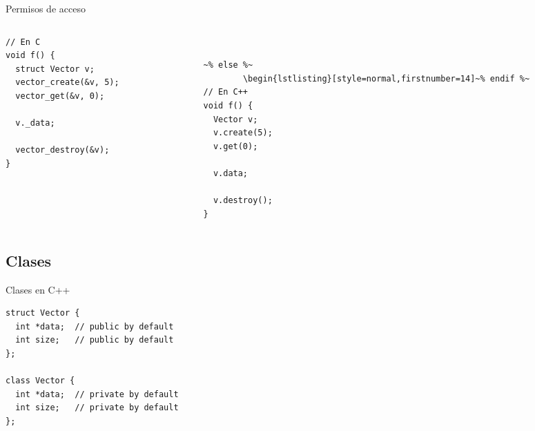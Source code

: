 \begin{frame}[fragile]{Permisos de acceso}{}
   \begin{columns}[t]
      \begin{column}{.4\linewidth}
         \begin{lstlisting}[style=normal,firstnumber=14]
// En C
void f() {
  struct Vector v;
  vector_create(&v, 5);
  vector_get(&v, 0);

  v._data;

  vector_destroy(&v);
}
         \end{lstlisting}
     \end{column}
      \begin{column}{.4\linewidth}
                   ~%
        \begin{lstlisting}[style=normal,firstnumber=14,linebackgroundcolor={%
                 \btLstHLR<1>{20}%
         }]~% else %~
        \begin{lstlisting}[style=normal,firstnumber=14]~% endif %~
// En C++
void f() {
  Vector v;
  v.create(5);
  v.get(0);

  v.data;

  v.destroy();
}
        \end{lstlisting}
    \end{column}
\end{columns}
\end{frame}

\subsection{Clases}
\begin{frame}[fragile]{Clases en C++}
        \begin{lstlisting}[style=normal,firstnumber=1]
struct Vector {
  int *data;  // public by default
  int size;   // public by default
};

class Vector {
  int *data;  // private by default
  int size;   // private by default
};
        \end{lstlisting}
\end{frame}


